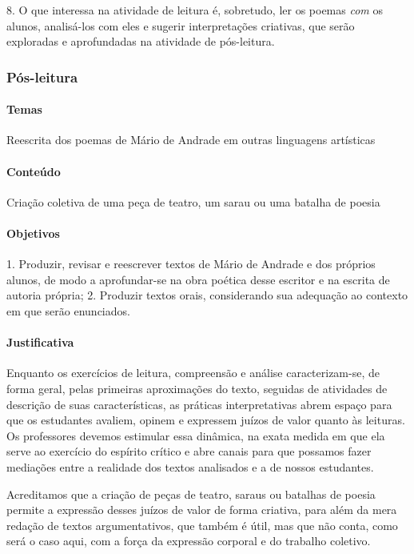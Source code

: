 \documentclass[11pt]{extarticle}
\begin{document}
8. O que interessa na atividade de leitura é, sobretudo, ler os poemas
\emph{com} os alunos, analisá-los com eles e sugerir interpretações
criativas, que serão exploradas e aprofundadas na atividade de
pós-leitura.

\subsubsection{Pós-leitura}



\paragraph{Temas} Reescrita dos poemas de Mário de Andrade em outras
linguagens artísticas

\paragraph{Conteúdo} Criação coletiva de uma peça de teatro, um sarau ou
uma batalha de poesia

\paragraph{Objetivos} 1. Produzir, revisar e reescrever textos de Mário de
Andrade e dos próprios alunos, de modo a aprofundar-se na obra poética
desse escritor e na escrita de autoria própria; 2. Produzir textos
orais, considerando sua adequação ao contexto em que serão enunciados.

\paragraph{Justificativa} Enquanto os exercícios de leitura, compreensão e
análise caracterizam-se, de forma geral, pelas primeiras aproximações do
texto, seguidas de atividades de descrição de suas características, as
práticas interpretativas abrem espaço para que os estudantes avaliem,
opinem e expressem juízos de valor quanto às leituras. Os professores
devemos estimular essa dinâmica, na exata medida em que ela serve ao
exercício do espírito crítico e abre canais para que possamos fazer
mediações entre a realidade dos textos analisados e a de nossos
estudantes.


Acreditamos que a criação de peças de teatro, saraus ou batalhas de
poesia permite a expressão desses juízos de valor de forma criativa,
para além da mera redação de textos argumentativos, que também é útil,
mas que não conta, como será o caso aqui, com a força da expressão
corporal e do trabalho coletivo.
\end{document}
